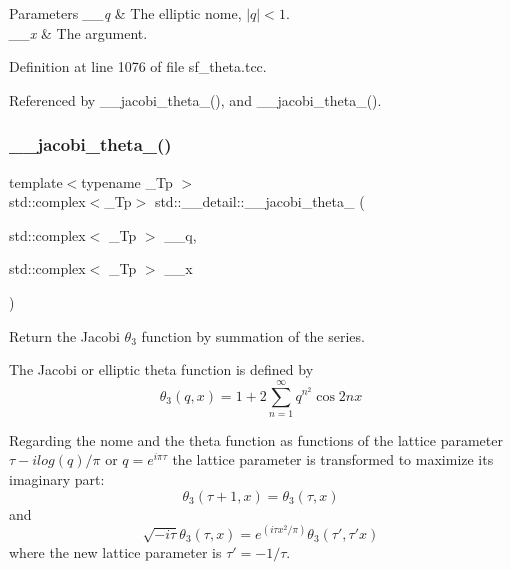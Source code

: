 \begin{DoxyParams}{Parameters}
{\em \+\_\+\+\_\+q} & The elliptic nome, $ |q| < 1 $. \\
\hline
{\em \+\_\+\+\_\+x} & The argument. \\
\hline
\end{DoxyParams}


Definition at line 1076 of file sf\+\_\+theta.\+tcc.



Referenced by \+\_\+\+\_\+jacobi\+\_\+theta\+\_(), and \+\_\+\+\_\+jacobi\+\_\+theta\+\_().

\mbox{\label{namespacestd_1_1____detail_ac7a6c396a102438d2c104f344b4f6a72}} 
\subsubsection{\texorpdfstring{\+\_\+\+\_\+jacobi\+\_\+theta\+\_()}{\_\_jacobi\_theta\_3()}\hspace{0.1cm}{\footnotesize\ttfamily [1/2]}}
{\footnotesize\ttfamily template$<$typename \+\_\+\+Tp $>$ \\
std\+::complex$<$\+\_\+\+Tp$>$ std\+::\+\_\+\+\_\+detail\+::\+\_\+\+\_\+jacobi\+\_\+theta\+\_ (\begin{DoxyParamCaption}\item[{std\+::complex$<$ \+\_\+\+Tp $>$}]{\+\_\+\+\_\+q,  }\item[{std\+::complex$<$ \+\_\+\+Tp $>$}]{\+\_\+\+\_\+x }\end{DoxyParamCaption})}

Return the Jacobi $ \theta_3 $ function by summation of the series.

The Jacobi or elliptic theta function is defined by \[ \theta_3(q,x) = 1 + 2\sum_{n=1}^{\infty} q^{n^2}\cos{2nx} \]

Regarding the nome and the theta function as functions of the lattice parameter $ \tau -i log(q)/ \pi $ or $ q = e^{i\pi\tau} $ the lattice parameter is transformed to maximize its imaginary part\+: \[ \theta_3(\tau+1,x) = \theta_3(\tau,x) \] and \[ \sqrt{-i\tau}\theta_3(\tau,x) = e^{(i\tau x^2/\pi)}\theta_3(\tau',\tau' x) \] where the new lattice parameter is $ \tau' = -1/\tau $.

